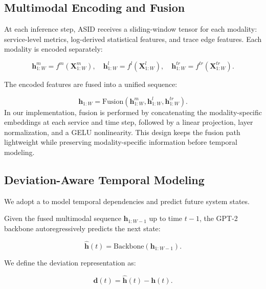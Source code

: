 \subsection{Multimodal Encoding and Fusion}

At each inference step, ASID receives a sliding-window tensor for each modality: service-level metrics, log-derived statistical features, and trace edge features. Each modality is encoded separately:

\begin{equation}
\mathbf{h}^{m}_{1:W} = f^{m}(\mathbf{X}^{m}_{1:W}), \quad
\mathbf{h}^{l}_{1:W} = f^{l}(\mathbf{X}^{l}_{1:W}), \quad
\mathbf{h}^{tr}_{1:W} = f^{tr}(\mathbf{X}^{tr}_{1:W}).
\end{equation}

The encoded features are fused into a unified sequence:

\begin{equation}
\mathbf{h}_{1:W} = \text{Fusion}(\mathbf{h}^{m}_{1:W}, \mathbf{h}^{l}_{1:W}, \mathbf{h}^{tr}_{1:W}).
\end{equation}
In our implementation, fusion is performed by concatenating the modality-specific embeddings at each service and time step, followed by a linear projection, layer normalization, and a GELU nonlinearity. This design keeps the fusion path lightweight while preserving modality-specific information before temporal modeling.

\subsection{Deviation-Aware Temporal Modeling}

We adopt a  to model temporal dependencies and predict future system states. 

Given the fused multimodal sequence $\mathbf{h}_{1:W-1}$ up to time $t-1$, the GPT-2 backbone autoregressively predicts the next state:

\begin{equation}
\hat{\mathbf{h}}(t) = \text{Backbone}(\mathbf{h}_{1:W-1}).
\end{equation}

We define the deviation representation as:

\begin{equation}
\mathbf{d}(t) = \hat{\mathbf{h}}(t) - \mathbf{h}(t).
\end{equation}

